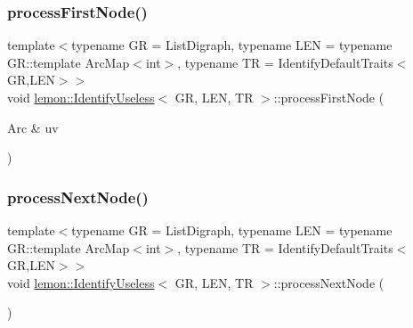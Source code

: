 \mbox{\label{classlemon_1_1_identify_useless_abb11e995306aa60344184e068b88468f}} 
\subsubsection{\texorpdfstring{process\+First\+Node()}{processFirstNode()}}
{\footnotesize\ttfamily template$<$typename GR  = List\+Digraph, typename L\+EN  = typename G\+R\+::template Arc\+Map$<$int$>$, typename TR  = Identify\+Default\+Traits$<$\+G\+R,\+L\+E\+N$>$$>$ \\
void \hyperlink{classlemon_1_1_identify_useless}{lemon\+::\+Identify\+Useless}$<$ GR, L\+EN, TR $>$\+::process\+First\+Node (\begin{DoxyParamCaption}\item[{Arc \&}]{uv }\end{DoxyParamCaption})\hspace{0.3cm}{\ttfamily [inline]}}

\mbox{\label{classlemon_1_1_identify_useless_ac85abcff75b0d1cb745e3972b35d7ec6}} 
\subsubsection{\texorpdfstring{process\+Next\+Node()}{processNextNode()}}
{\footnotesize\ttfamily template$<$typename GR  = List\+Digraph, typename L\+EN  = typename G\+R\+::template Arc\+Map$<$int$>$, typename TR  = Identify\+Default\+Traits$<$\+G\+R,\+L\+E\+N$>$$>$ \\
void \hyperlink{classlemon_1_1_identify_useless}{lemon\+::\+Identify\+Useless}$<$ GR, L\+EN, TR $>$\+::process\+Next\+Node (\begin{DoxyParamCaption}{ }\end{DoxyParamCaption})\hspace{0.3cm}{\ttfamily [inline]}}

\mbox{\label{classlemon_1_1_identify_useless_aee17692788038ba6058f5dc4b74ae3af}} 
